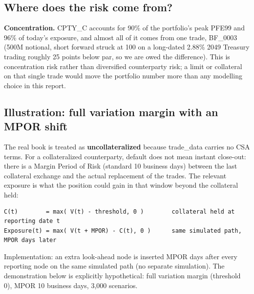 \documentclass[11pt,letterpaper]{article}
\begin{document}
\subsection{Where does the risk come from?}
\textbf{Concentration.} CPTY\_C accounts for 90\% of the portfolio's peak PFE99 and 96\% of today's exposure, and almost all of it comes from one trade, BF\_0003 (500M notional, short forward struck at 100 on a long-dated 2.88\% 2049 Treasury trading roughly 25 points below par, so we are owed the difference). This is concentration risk rather than diversified counterparty risk; a limit or collateral on that single trade would move the portfolio number more than any modelling choice in this report.

\subsection{Illustration: full variation margin with an MPOR shift}
The real book is treated as \textbf{uncollateralized} because trade\_data carries no CSA terms. For a collateralized counterparty, default does not mean instant close-out: there is a Margin Period of Risk (standard 10 business days) between the last collateral exchange and the actual replacement of the trades. The relevant exposure is what the position could gain in that window beyond the collateral held:

{\fontsize{7.2}{8.8}\selectfont
\begin{verbatim}
C(t)        = max( V(t) - threshold, 0 )        collateral held at reporting date t
Exposure(t) = max( V(t + MPOR) - C(t), 0 )      same simulated path, MPOR days later
\end{verbatim}}
Implementation: an extra look-ahead node is inserted MPOR days after every reporting node on the same simulated path (no separate simulation). The demonstration below is explicitly hypothetical: full variation margin (threshold 0), MPOR 10 business days, 3,000 scenarios.
\end{document}
